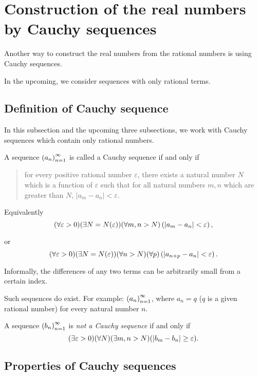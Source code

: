 \section{Construction of the real numbers by Cauchy sequences}

Another way to construct the real numbers from the rational numbers is using Cauchy sequences.

In the upcoming, we consider sequences with only rational terms.

\subsection{Definition of Cauchy sequence}

In this subsection and the upcoming three subsections, we work with Cauchy sequences which contain only rational numbers.

\begin{definition}
    A sequence ${\left({a_{n}}\right)}^{\infty}_{n=1}$ is called a Cauchy sequence if and only if
    \begin{quotation}
        \noindent for every positive rational number $\varepsilon$, there exists a natural number $N$ which is a function of $\varepsilon$ such that for all natural numbers $m, n$ which are greater than $N$, $\left\vert a_{m} - a_{n}\right\vert < \varepsilon$.
    \end{quotation}

    Equivalently
    \[
        (\forall\varepsilon > 0)(\exists N=N(\varepsilon))(\forall m, n > N)\left(\left\vert{a_{m} - a_{n}}\right\vert < \varepsilon\right),
    \]

    or
    \[
        (\forall\varepsilon > 0)(\exists N=N(\varepsilon))(\forall n > N)(\forall p)\left(\left\vert{a_{n+p} - a_{n}}\right\vert < \varepsilon\right).
    \]
\end{definition}

Informally, the differences of any two terms can be arbitrarily small from a certain index.

\bigskip

Such sequences do exist. For example: ${\left({a_{n}}\right)}^{\infty}_{n=1}$, where $a_{n} = q$ ($q$ is a given rational number) for every natural number $n$.

A sequence ${\left({b_{n}}\right)}^{\infty}_{n=1}$ is \textit{not a Cauchy sequence} if and only if
\[
    (\exists\varepsilon > 0)(\forall N)(\exists m, n > N)(\left\vert{b_{m} - b_{n}}\right\vert\ge\varepsilon).
\]

\subsection{Properties of Cauchy sequences}

